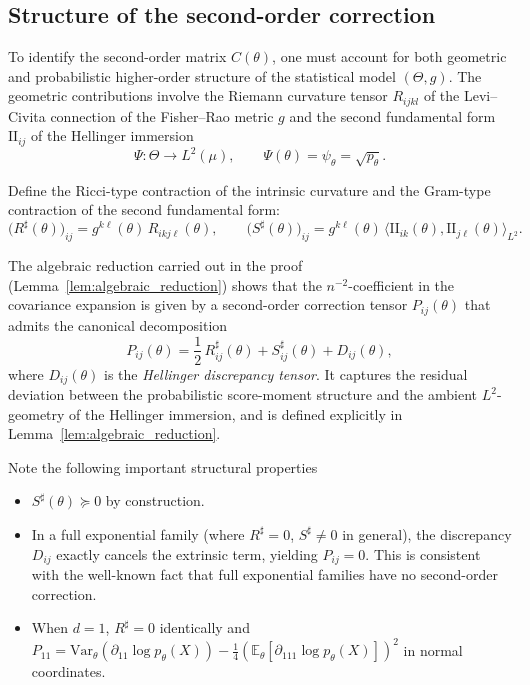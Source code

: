 \documentclass[11pt,letterpaper]{amsart}
\numberwithin{equation}{section}
\theoremstyle{plain}
\theoremstyle{definition}
\theoremstyle{remark}
\begin{document}
\subsection{Structure of the second-order correction}

To identify the second-order matrix \(C(\theta)\), one must account for both geometric and probabilistic higher-order structure of the statistical model \((\Theta,g)\). The geometric contributions involve the Riemann curvature tensor \(R_{ijkl}\) of the Levi--Civita connection of the Fisher--Rao metric \(g\) and the second fundamental form \(\mathrm{II}_{ij}\) of the Hellinger immersion
\[
\Psi:\Theta\to L^2(\mu),
\qquad
\Psi(\theta)=\psi_\theta=\sqrt{p_\theta}.
\]

Define the Ricci-type contraction of the intrinsic curvature and the Gram-type contraction of the second fundamental form:
\begin{equation*}
\big(R^\sharp(\theta)\big)_{ij}
=
g^{k\ell}(\theta)\,R_{ikj\ell}(\theta),
\qquad
\big(S^\sharp(\theta)\big)_{ij}
=
g^{k\ell}(\theta)\,
\big\langle \mathrm{II}_{ik}(\theta),\mathrm{II}_{j\ell}(\theta)\big\rangle_{L^2}.
\end{equation*}

The algebraic reduction carried out in the proof (Lemma~\ref{lem:algebraic_reduction}) shows that the \(n^{-2}\)-coefficient in the covariance expansion is given by a second-order correction tensor \(P_{ij}(\theta)\) that admits the canonical decomposition
\begin{equation*}
P_{ij}(\theta)
=
\frac{1}{2}\,R^\sharp_{ij}(\theta)
+
S^\sharp_{ij}(\theta)
+
D_{ij}(\theta),
\end{equation*}
where \(D_{ij}(\theta)\) is the \emph{Hellinger discrepancy tensor}. It captures the residual deviation between the probabilistic score-moment structure and the ambient \(L^2\)-geometry of the Hellinger immersion, and is defined explicitly in Lemma~\ref{lem:algebraic_reduction}.

Note the following important structural properties
\begin{itemize}
\item \(S^\sharp(\theta)\succeq 0\) by construction.
\item In a full exponential family (where \(R^\sharp=0\), \(S^\sharp\ne 0\) in general), the discrepancy \(D_{ij}\) exactly cancels the extrinsic term, yielding \(P_{ij}=0\). This is consistent with the well-known fact that full exponential families have no second-order correction.
\item When \(d=1\), \(R^\sharp=0\) identically and \(P_{11}=\mathrm{Var}_{\theta}(\partial_{11}\log p_\theta(X))-\frac{1}{4}(\mathbb{E}_\theta[\partial_{111}\log p_\theta(X)])^2\) in normal coordinates. 
\end{itemize}
\end{document}

